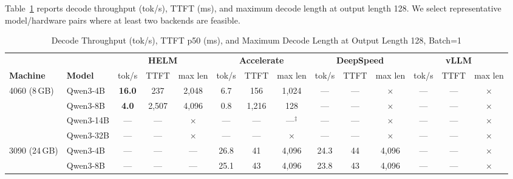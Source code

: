 \documentclass[lettersize,journal]{IEEEtran}
\begin{document}
Table~\ref{tab:throughput} reports decode throughput (tok/s), TTFT (ms), and maximum decode length
at output length 128. We select representative model/hardware pairs where
at least two backends are feasible.

\begin{table}[!t]
\caption{Decode Throughput (tok/s), TTFT p50 (ms), and Maximum Decode Length at Output Length 128, Batch=1}
\label{tab:throughput}
\centering
\small
\begin{tabular}{llcccccccccccc}
\toprule
& & \multicolumn{3}{c}{\textbf{HELM}} & \multicolumn{3}{c}{\textbf{Accelerate}}
  & \multicolumn{3}{c}{\textbf{DeepSpeed}} & \multicolumn{3}{c}{\textbf{vLLM}} \\
\cmidrule(lr){3-5}\cmidrule(lr){6-8}\cmidrule(lr){9-11}\cmidrule(lr){12-14}
\textbf{Machine} & \textbf{Model} & tok/s & TTFT & max len & tok/s & TTFT & max len & tok/s & TTFT & max len & tok/s & TTFT & max len \\
\midrule
\multirow{4}{*}{4060 (8\,GB)}
& Qwen3-4B      & \textbf{16.0}  & 237            & 2{,}048        & 6.7            & 156            & 1{,}024        & ---            & ---            & $\times$       & ---            & ---            & $\times$       \\
& Qwen3-8B      & \textbf{4.0}   & 2{,}507        & 4{,}096        & 0.8            & 1{,}216        & 128            & ---            & ---            & $\times$       & ---            & ---            & $\times$       \\
& Qwen3-14B     & ---            & ---            & $\times$       & ---            & ---            & ---$^\ddagger$  & ---            & ---            & $\times$       & ---            & ---            & $\times$       \\
& Qwen3-32B     & ---            & ---            & $\times$       & ---            & ---            & $\times$       & ---            & ---            & $\times$       & ---            & ---            & $\times$       \\
\midrule
\multirow{4}{*}{3090 (24\,GB)}
& Qwen3-4B      & ---            & ---            & ---            & 26.8           & 41             & 4{,}096        & 24.3           & 44             & 4{,}096        & ---            & ---            & $\times$       \\
& Qwen3-8B      & ---            & ---            & ---            & 25.1           & 43             & 4{,}096        & 23.8           & 43             & 4{,}096        & ---            & ---            & $\times$       \\

\end{tabular}
\end{table}
\end{document}
